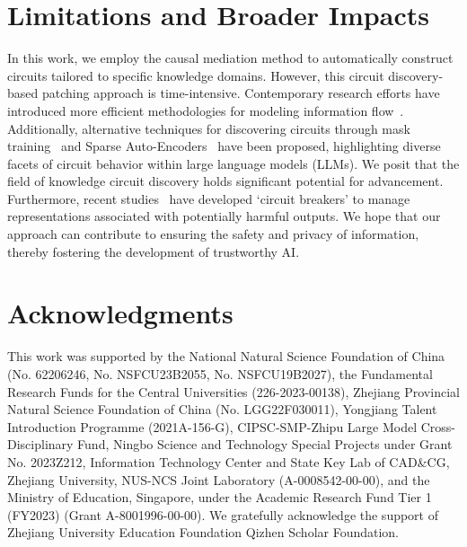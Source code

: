 \documentclass{article}
\begin{document}

\section*{Limitations and Broader Impacts}
\label{sec: limitation}
In this work, we employ the causal mediation method to automatically construct circuits tailored to specific knowledge domains.
However, this circuit discovery-based patching approach is time-intensive. 
Contemporary research efforts have introduced more efficient methodologies for modeling information flow~\cite{ferrando2024information,syed2023attribution,hanna2024have}. Additionally, alternative techniques for discovering circuits through mask training~\cite{bhaskar2024finding,yu2024functional} and Sparse Auto-Encoders~\cite{bricken2023monosemanticity,he2024dictionary} have been proposed, highlighting diverse facets of circuit behavior within large language models (LLMs).
We posit that the field of knowledge circuit discovery holds significant potential for advancement. 
Furthermore, recent studies~\cite{zou2024improving} have developed `circuit breakers' to manage representations associated with potentially harmful outputs. 
We hope that our approach can contribute to ensuring the safety and privacy of information, thereby fostering the development of trustworthy AI.


\section*{Acknowledgments}

This work was supported by the National Natural Science Foundation of China (No. 62206246, No. NSFCU23B2055, No. NSFCU19B2027), the Fundamental Research Funds for the Central Universities (226-2023-00138), Zhejiang Provincial Natural Science Foundation of China (No. LGG22F030011), Yongjiang Talent Introduction Programme (2021A-156-G), CIPSC-SMP-Zhipu Large Model Cross-Disciplinary Fund, Ningbo Science and Technology Special Projects under Grant No. 2023Z212, Information Technology Center and State Key Lab of CAD\&CG, Zhejiang University, NUS-NCS Joint Laboratory (A-0008542-00-00), and the Ministry of Education, Singapore, under the Academic Research Fund Tier 1 (FY2023) (Grant A-8001996-00-00).
We gratefully acknowledge the support of Zhejiang University Education Foundation Qizhen Scholar Foundation.





% 
\newpage


\clearpage
%
\end{document}
